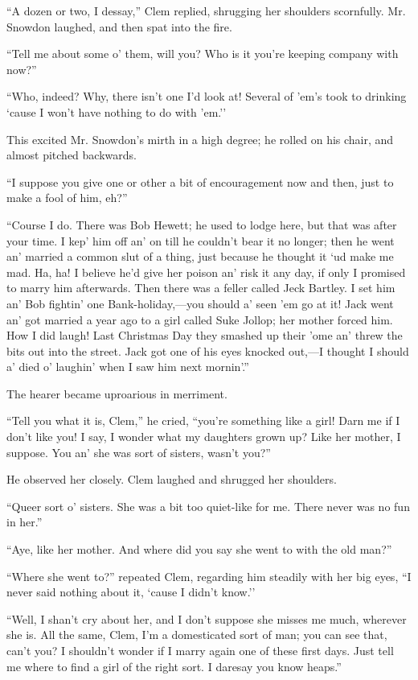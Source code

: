 ``A dozen or two, I dessay,'' Clem replied, shrugging her shoulders
scornfully. Mr. Snowdon laughed, and then spat into the fire.

``Tell me about some o' them, will you?
{\protect\hypertarget{13}{}{}}Who is it you're keeping company with
now?''

``Who, indeed? Why, there isn't one I'd look at! Several of 'em's took
to drinking `cause I won't have nothing to do with 'em.''

This excited Mr. Snowdon's mirth in a high degree; he rolled on his
chair, and almost pitched backwards.

``I suppose you give one or other a bit of encouragement now and then,
just to make a fool of him, eh?''

``Course I do. There was Bob Hewett; he used to lodge here, but that was
after your time. I kep' him off an' on till he couldn't bear it no
longer; then he went an' married a common slut of a thing, just because
he thought it `ud make me mad. Ha, ha! I believe he'd give her poison
an' risk it any day, if only I promised to marry him afterwards. Then
there was a feller called Jeck Bartley. I set him an' Bob fightin' one
Bank-holiday,---you should a' seen 'em go at it! Jack went an' got
married a year ago to a girl called Suke Jollop; her mother forced
{\protect\hypertarget{14}{}{}}him. How I did laugh! Last Christmas Day
they smashed up their 'ome an' threw the bits out into the street. Jack
got one of his eyes knocked out,---I thought I should a' died o'
laughin' when I saw him next mornin'.''

The hearer became uproarious in merriment.

``Tell you what it is, Clem,'' he cried, ``you're something like a girl!
Darn me if I don't like you! I say, I wonder what my daughters grown up?
Like her mother, I suppose. You an' she was sort of sisters, wasn't
you?''

He observed her closely. Clem laughed and shrugged her shoulders.

``Queer sort o' sisters. She was a bit too quiet-like for me. There
never was no fun in her.''

``Aye, like her mother. And where did you say she went to with the old
man?''

``Where she went to?'' repeated Clem, regarding him steadily with her
big eyes, ``I never said nothing about it, `cause I didn't know.''

``Well, I shan't cry about her, and I don't
{\protect\hypertarget{15}{}{}}suppose she misses me much, wherever she
is. All the same, Clem, I'm a domesticated sort of man; you can see
that, can't you? I shouldn't wonder if I marry again one of these first
days. Just tell me where to find a girl of the right sort. I daresay you
know heaps.''

